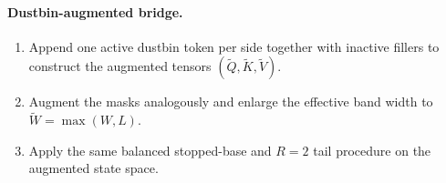 \documentclass{article}
\begin{document}
\paragraph{Dustbin-augmented bridge.}
\begin{enumerate}
    \item Append one active dustbin token per side together with inactive fillers to construct the augmented tensors $(\widetilde Q,\widetilde K,\widetilde V)$.
    \item Augment the masks analogously and enlarge the effective band width to $\widetilde W=\max(W,L)$.
    \item Apply the same balanced stopped-base and $R=2$ tail procedure on the augmented state space.
\end{enumerate}
\end{document}
